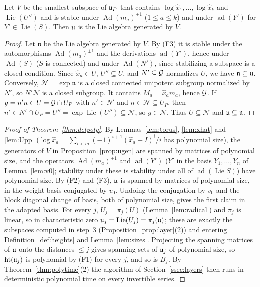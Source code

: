 \begin{proposition}\label{prop:ugen}
Let $V$ be the smallest subspace of $\mathfrak{u}_P$ that contains $\log\hat x_1,\ldots,\log\hat x_k$ and
$\operatorname{Lie}(U'')$ and is stable under $\operatorname{Ad}(m_a)^{\pm1}$ ($1\le a\le k$) and under $\operatorname{ad}(Y')$ for $Y'\in\operatorname{Lie}(S)$.
Then $\mathfrak{u}$ is the Lie algebra generated by $V$.
\end{proposition}
\begin{proof}
Let $\mathfrak n$ be the Lie algebra generated by $V$. By (F3) it is stable under the automorphisms
$\operatorname{Ad}(m_a)^{\pm1}$ and the derivations $\operatorname{ad}(Y')$, hence under $\operatorname{Ad}(S)$ ($S$ is connected) and under
$\operatorname{Ad}(N')$, since stabilizing a subspace is a closed condition. Since $\hat x_a\in U$, $U''\subseteq U$, and
$N'\subseteq\mathcal{G}$ normalizes $U$, we have $\mathfrak n\subseteq\mathfrak{u}$. Conversely, $\mathcal N=\exp\mathfrak n$ is a closed
connected unipotent subgroup normalized by $N'$, so $N'\mathcal N$ is a closed subgroup. It contains
$M_a=\hat x_am_a$, hence $\mathcal{G}$. If $g=n'n\in U=\mathcal{G}\cap U_P$ with $n'\in N'$ and $n\in\mathcal N\subseteq U_P$, then
$n'\in N'\cap U_P=U''=\exp\operatorname{Lie}(U'')\subseteq\mathcal N$, so $g\in\mathcal N$. Thus $U\subseteq\mathcal N$ and
$\mathfrak{u}\subseteq\mathfrak n$.
\end{proof}

\begin{proof}[Proof of Theorem~\ref{thm:detpoly}]
By Lemmas~\ref{lem:torus}, \ref{lem:xhat} and \ref{lem:Upp} ($\log\hat x_a=\sum_{i<m}(-1)^{i+1}(\hat x_a-I)^i/i$
has polynomial size), the generators of $V$ in
Proposition~\ref{prop:ugen} are spanned by matrices of polynomial size, and the operators $\operatorname{Ad}(m_a)^{\pm1}$ and
$\operatorname{ad}(Y')$ ($Y'$ in the basis $Y_1,\ldots,Y_n$ of Lemma~\ref{lem:v0}; stability under these is stability
under all of $\operatorname{ad}(\operatorname{Lie}S)$) have polynomial size. By (F2) and (F3),
$\mathfrak{u}$ is spanned by matrices of polynomial size, in the weight basis conjugated by $v_0$. Undoing the
conjugation by $v_0$ and the block diagonal change of basis, both of polynomial size, gives the first
claim in the adapted basis. For every $j$, $U_j=\pi_j(U)$ (Lemma~\ref{lem:radical}) and $\pi_j$ is linear, so in characteristic zero
$\mathfrak{u}_j=\operatorname{Lie}(U_j)=\pi_j(\mathfrak{u})$; these are exactly the subspaces computed in step~3
(Proposition~\ref{prop:layer}(2)) and entering Definition~\ref{def:heights} and Lemma~\ref{lem:sizes}.
Projecting the spanning matrices of $\mathfrak{u}$ onto the distances $\le j$ gives spanning sets of $\mathfrak{u}_j$ of
polynomial size, so $\operatorname{ht}(\mathfrak{u}_j)$ is polynomial by (F1) for every $j$, and so is $B_f$. By
Theorem~\ref{thm:polytime}(2) the algorithm of Section~\ref{ssec:layers} then runs in deterministic polynomial
time on every invertible series.
\end{proof}

